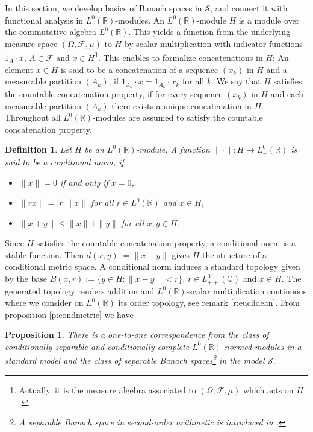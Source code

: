 \documentclass{jloganal}
\numberwithin{equation}{section}
\theoremstyle{plain}
\newtheorem{proposition}[subsection]{Proposition}
\newtheorem{definition}[subsection]{Definition}
\renewcommand{\leq}{\leqslant}
\renewcommand\R{\mathbb{R}}
\begin{document}
In this section, we develop basics of Banach spaces in $\mathcal{S}$, and connect it with functional analysis in $L^0(\mathbb{R})$-modules. 
An $L^0(\mathbb{R})$-module $H$ is a module over the commutative algebra $L^0(\mathbb{R})$. 
This yields a function from the underlying measure space $(\Omega,\mathcal{F},\mu)$ to $H$ by scalar multiplication with indicator functions $1_A\cdot x$, $A\in\mathcal{F}$ and $x\in H$\footnote{Actually, it is the measure algebra associated to $(\Omega,\mathcal{F},\mu)$ which acts on $H$.}. 
This enables to formalize concatenations in $H$:  
An element $x\in H$ is said to be a concatenation of a sequence $(x_k)$ in $H$ and a measurable partition $(A_k)$, if $1_{A_k}\cdot x = 1_{A_k} \cdot x_k$ for all $k$. 
We say that $H$ satisfies the countable concatenation property, if for every sequence $(x_k)$ in $H$ and each measurable partition $(A_k)$ there exists a unique concatenation in $H$. 
Throughout all $L^0(\mathbb{R})$-modules are assumed to satisfy the countable concatenation property.  
\begin{definition}
 Let $H$ be an $L^0(\mathbb{R})$-module. 
A function $\|\cdot\|\colon H\to L^0_+(\mathbb{R})$ is said to be a \emph{conditional norm}, if  
\begin{itemize}
\item $\|x\|=0$ if and only if $x=0$,
\item $\|r x\|=|r|\|x\|$ for all $r\in L^0(\mathbb{R})$ and $x\in H$, 
\item  $\|x+ y\|\leq \|x\|+\|y\|$ for all $x,y\in H$. 
\end{itemize}
\end{definition}
Since $H$ satisfies the countable concatenation property, a conditional norm is a stable function. 
Then $d(x,y):=\|x-y\|$ gives $H$ the structure of a conditional metric space. 
A conditional norm induces a standard topology given by the base 
$B(x,r):=\{y\in H\colon \|x-y\|<r\}$, $r\in L^0_{++}(\mathbb{Q})$ and $x\in H$.  
The generated topology renders addition and $L^0(\mathbb{R})$-scalar multiplication continuous where we consider on $L^0(\mathbb{R})$ its order topology, see remark \ref{r:euclidean}. 
From proposition \ref{p:condmetric} we have   
\begin{proposition}
There is a one-to-one correspondence from the class of conditionally separable and conditionally complete $L^0(\R)$-normed modules in a standard model and the class of separable Banach spaces\footnote{A separable Banach space in second-order arithmetic is introduced in \cite[Definition II.10.1]{simpson2009subsystems}.} 
 in the model $\mathcal{S}$. 
\end{proposition}    
\end{document}
